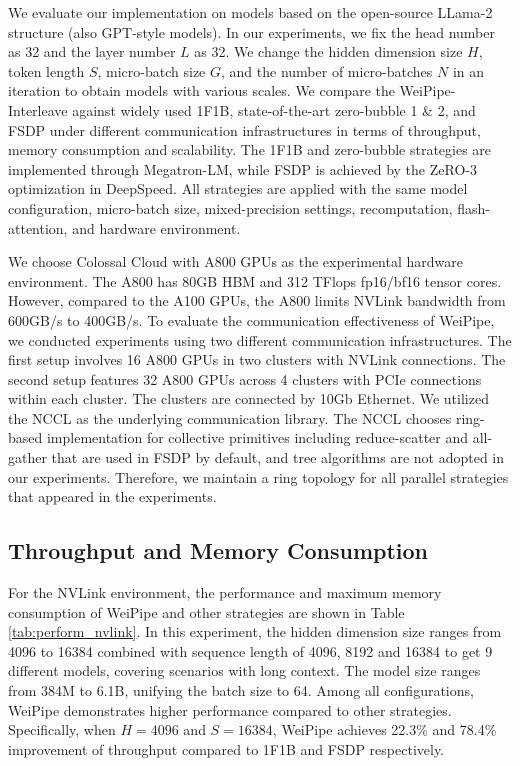 \documentclass[sigplan,screen]{acmart}
\begin{document}
We evaluate our implementation on models based on the open-source LLama-2 structure\cite{touvron2023llama2openfoundation} (also GPT-style models). In our experiments, we fix the head number as 32 and the layer number $L$ as 32. We change the hidden dimension size $H$, token length $S$, micro-batch size $G$, and the number of micro-batches $N$ in an iteration to obtain models with various scales. We compare the WeiPipe-Interleave against widely used 1F1B, state-of-the-art zero-bubble 1 \& 2, and FSDP under different communication infrastructures in terms of throughput, memory consumption and scalability. The 1F1B and zero-bubble strategies are implemented through Megatron-LM, while FSDP is achieved by the ZeRO-3 optimization in DeepSpeed. All strategies are applied with the same model configuration, micro-batch size, mixed-precision settings, recomputation, flash-attention, and hardware environment.

We choose Colossal Cloud with A800 GPUs as the experimental hardware environment. The A800 has 80GB HBM and 312 TFlops fp16/bf16 tensor cores. However, compared to the A100 GPUs, the A800 limits NVLink bandwidth from 600GB/s to 400GB/s. To evaluate the communication effectiveness of WeiPipe, we conducted experiments using two different communication infrastructures. The first setup involves 16 A800 GPUs in two clusters with NVLink\cite{nvlink} connections. The second setup features 32 A800 GPUs across 4 clusters with PCIe connections within each cluster. The clusters are connected by 10Gb Ethernet. We utilized the NCCL as the underlying communication library. The NCCL chooses ring-based implementation for collective primitives including reduce-scatter and all-gather that are used in FSDP by default, and tree algorithms are not adopted in our experiments. Therefore, we maintain a ring topology for all parallel strategies that appeared in the experiments.

\subsection{Throughput and Memory Consumption}

For the NVLink environment, the performance and maximum memory consumption of WeiPipe and other strategies are shown in Table \ref{tab:perform_nvlink}. In this experiment, the hidden dimension size ranges from 4096 to 16384 combined with sequence length of 4096, 8192 and 16384 to get 9 different models, covering scenarios with long context. The model size ranges from 384M to 6.1B, unifying the batch size to 64. Among all configurations, WeiPipe demonstrates higher performance compared to other strategies. Specifically, when $H=4096$ and $S=16384$, WeiPipe achieves 22.3\% and 78.4\% improvement of throughput compared to 1F1B and FSDP respectively. 
\end{document}
